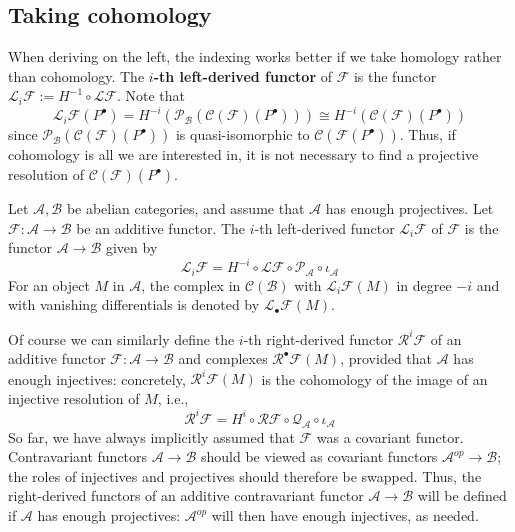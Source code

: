 \subsection{Taking cohomology}
When deriving on the left, the indexing works better if we take homology rather than cohomology. The
\textbf{$i$-th left-derived functor} of $\mathscr{F}$ is the functor $\mathcal{L}_i\mathscr{F}:=H^{-1}\circ\mathcal{L}\mathscr{F}$. Note that
\[\mathcal{L}_i\mathscr{F}(P^\bullet)=H^{-i}(\mathscr{P}_{\mathcal{B}}(\mathcal{C}(\mathscr{F})(P^\bullet)))\cong H^{-i}(\mathcal{C}(\mathscr{F})(P^\bullet))\]
since $\mathscr{P}_{\mathcal{B}}(\mathcal{C}(\mathscr{F})(P^\bullet))$ is quasi-isomorphic to $\mathcal{C}(\mathscr{F}(P^\bullet))$. Thus, if cohomology is all we are interested in, it is not necessary to find a projective resolution of $\mathcal{C}(\mathscr{F})(P^\bullet)$.
\begin{definition}
Let $\mathcal{A},\mathcal{B}$ be abelian categories, and assume that $\mathcal{A}$ has enough
projectives. Let $\mathscr{F}:\mathcal{A}\to\mathcal{B}$ be an additive functor. The $i$-th left-derived functor $\mathcal{L}_i\mathscr{F}$ of $\mathscr{F}$ is the functor $\mathcal{A}\to\mathcal{B}$ given by
\[\mathcal{L}_i\mathscr{F}=H^{-i}\circ\mathcal{L}\mathscr{F}\circ\mathscr{P}_{\mathcal{A}}\circ\iota_{\mathcal{A}}\]
For an object $M$ in $\mathcal{A}$, the complex in $\mathcal{C}(\mathcal{B})$ with $\mathcal{L}_i\mathscr{F}(M)$ in degree $-i$ and with vanishing differentials is denoted by $\mathcal{L}_{\bullet}\mathscr{F}(M)$.
\end{definition}
Of course we can similarly define the $i$-th right-derived functor $\mathcal{R}^i\mathscr{F}$ of an
additive functor $\mathscr{F}:\mathcal{A}\to\mathcal{B}$ and complexes $\mathcal{R}^\bullet\mathscr{F}(M)$, provided that $\mathcal{A}$ has enough injectives: concretely, $\mathcal{R}^i\mathscr{F}(M)$ is the cohomology of the image of an injective resolution of $M$, i.e.,
\[\mathcal{R}^i\mathscr{F}=H^i\circ\mathcal{R}\mathscr{F}\circ\mathscr{Q}_{\mathcal{A}}\circ\iota_{\mathcal{A}}\]
So far, we have always implicitly assumed that $\mathscr{F}$ was a covariant functor. Contravariant functors $\mathcal{A}\to\mathcal{B}$ should be viewed as covariant functors $\mathcal{A}^{op}\to\mathcal{B}$; the roles of injectives and projectives should therefore be
swapped. Thus, the right-derived functors of an additive contravariant functor $\mathcal{A}\to\mathcal{B}$ will be defined if $\mathcal{A}$ has enough projectives: $\mathcal{A}^{op}$ will then have enough injectives, as needed.
